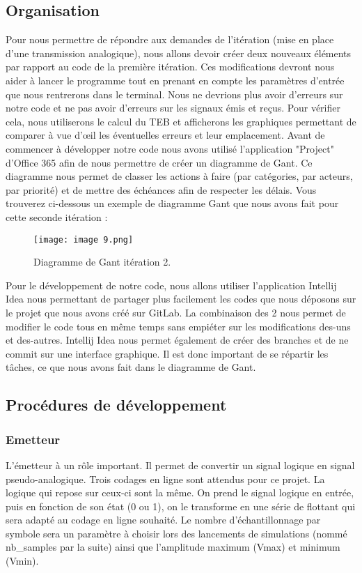 \subsection{Organisation}

Pour nous permettre de répondre aux demandes de l'itération (mise en place d'une transmission analogique), nous allons devoir créer deux nouveaux éléments par rapport au code de la première itération. Ces modifications devront nous aider à lancer le programme tout en prenant en compte les paramètres d'entrée que nous rentrerons dans le terminal.
Nous ne devrions plus avoir d'erreurs sur notre code et ne pas avoir d'erreurs sur les signaux émis et reçus. Pour vérifier cela, nous utiliserons le calcul du TEB et afficherons les graphiques permettant de comparer à vue d'œil les éventuelles erreurs et leur emplacement.
Avant de commencer à développer notre code nous avons utilisé l'application "Project" d'Office 365 afin de nous permettre de créer un diagramme de Gant. Ce diagramme nous permet de classer les actions à faire (par catégories, par acteurs, par priorité) et de mettre des échéances afin de respecter les délais. Vous trouverez ci-dessous un exemple de diagramme Gant que nous avons fait pour cette seconde itération :

\begin{figure}[h]
    \centering
    \texttt{[image: image 9.png]}
    \caption{\label{fig:image9}Diagramme de Gant itération 2.}
\end{figure}

Pour le développement de notre code, nous allons utiliser l'application Intellij Idea nous permettant de partager plus facilement les codes que nous déposons sur le projet que nous avons créé sur GitLab. La combinaison des 2 nous permet de modifier le code tous en même temps sans empiéter sur les modifications des-uns et des-autres. Intellij Idea nous permet également de créer des branches et de ne commit sur une interface graphique. Il est donc important de se répartir les tâches, ce que nous avons fait dans le diagramme de Gant.

\subsection{Procédures de développement}
\subsubsection{Emetteur}

L'émetteur à un rôle important. Il permet de convertir un signal logique en signal pseudo-analogique. Trois codages en ligne sont attendus pour ce projet. La logique qui repose sur ceux-ci sont la même. On prend le signal logique en entrée, puis en fonction de son état (0 ou 1), on le transforme en une série de flottant qui sera adapté au codage en ligne souhaité. Le nombre d'échantillonnage par symbole sera un paramètre à choisir lors des lancements de simulations (nommé nb\_samples par la suite) ainsi que l'amplitude maximum (Vmax) et minimum (Vmin).

